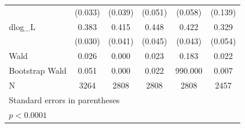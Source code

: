 \begin{table}[htbp]
\begin{tabular}{l*{5}{c}}
            &     (0.033)       &     (0.039)       &     (0.051)       &     (0.058)       &     (0.139)       \\
[1em]
dlog\_L      &       0.383\sym{*}&       0.415\sym{*}&       0.448\sym{*}&       0.422\sym{*}&       0.329\sym{*}\\
            &     (0.030)       &     (0.041)       &     (0.045)       &     (0.043)       &     (0.054)       \\
\hline
Wald        &       0.026       &       0.000       &       0.023       &       0.183       &       0.022       \\
Bootstrap Wald&       0.051       &       0.000       &       0.022       &     990.000       &       0.007       \\
N           &        3264       &        2808       &        2808       &        2808       &        2457       \\
\hline\hline
\multicolumn{6}{l}{\footnotesize Standard errors in parentheses}\\
\multicolumn{6}{l}{\footnotesize \sym{*} \(p<0.0001\)}\\
\end{tabular}
\end{table}
